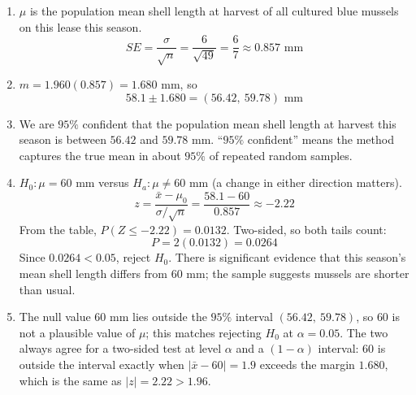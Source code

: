 \documentclass[11pt]{article}
\begin{document}
\begin{solution}
\begin{enumerate}
  \item $\mu$ is the population mean shell length at harvest of all cultured blue mussels on this lease this season.
  \[
  SE=\frac{\sigma}{\sqrt n}=\frac{6}{\sqrt{49}}=\frac67\approx0.857\text{ mm}
  \]
  \item $m=1.960(0.857)=1.680$ mm, so
  \[
  58.1\pm1.680=(56.42,\ 59.78)\text{ mm}
  \]
  \item We are $95\%$ confident that the population mean shell length at harvest this season is between $56.42$ and $59.78$ mm. ``$95\%$ confident'' means the method captures the true mean in about $95\%$ of repeated random samples.
  \item $H_0:\mu=60$ mm versus $H_a:\mu\neq60$ mm (a change in either direction matters).
  \[
  z=\frac{\bar x-\mu_0}{\sigma/\sqrt n}=\frac{58.1-60}{0.857}\approx-2.22
  \]
  From the table, $P(Z\leq-2.22)=0.0132$. Two-sided, so both tails count:
  \[
  P=2(0.0132)=0.0264
  \]
  Since $0.0264<0.05$, reject $H_0$. There is significant evidence that this season's mean shell length differs from $60$ mm; the sample suggests mussels are shorter than usual.

  \begin{center}
  \end{center}
  \item The null value $60$ mm lies outside the $95\%$ interval $(56.42,\ 59.78)$, so $60$ is not a plausible value of $\mu$; this matches rejecting $H_0$ at $\alpha=0.05$. The two always agree for a two-sided test at level $\alpha$ and a $(1-\alpha)$ interval: $60$ is outside the interval exactly when $|\bar x-60|=1.9$ exceeds the margin $1.680$, which is the same as $|z|=2.22>1.96$.
\end{enumerate}
\end{solution}
\end{document}
